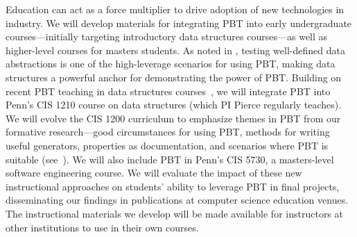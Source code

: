 %
Education can act as a force multiplier to drive adoption of new
technologies in industry.
We will develop materials for
integrating PBT into early undergraduate courses---initially targeting
introductory data structures
courses---as well as higher-level courses for masters students. As noted in , testing well-defined data
abstractions is one of the high-leverage scenarios for using PBT, making data
structures a powerful anchor for demonstrating the power of PBT.
%
Building on
recent PBT teaching in data structures
courses~\cite{wrenn2021using,nelson2021automated}, we will integrate PBT into
Penn's CIS 1210 course on data structures (which PI Pierce regularly teaches).
%
We
will evolve the CIS 1200 curriculum to emphasize themes in PBT from our
formative research---good circumstances for
using PBT, methods for writing useful generators, properties as
documentation, and scenarios where PBT is suitable
(see~).
%
We will also include PBT in Penn's CIS 5730, a masters-level software engineering
course.
%
We will evaluate the impact of these new
instructional approaches on students' ability to leverage PBT in final projects,
disseminating our findings in publications at computer science
education venues.
%
The instructional materials we develop will be made available for instructors at
other institutions to use in their own courses.


\immediate\closeout\workplanfile





